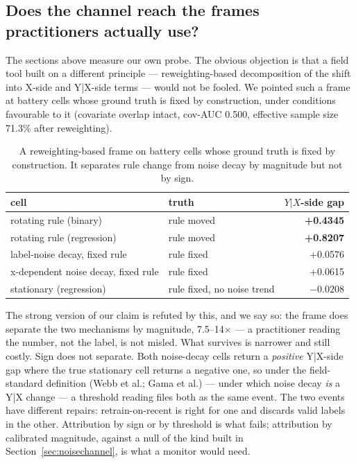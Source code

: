 \documentclass[10pt]{article} %
\begin{document}
\subsection{Does the channel reach the frames practitioners actually use?}\label{sec:frames}

The sections above measure our own probe. The obvious objection is that a field tool built on a
different principle --- reweighting-based decomposition of the shift into X-side and Y|X-side terms
--- would not be fooled. We pointed such a frame at battery cells whose ground truth is fixed by
construction, under conditions favourable to it (covariate overlap intact, cov-AUC 0.500, effective
sample size 71.3\% after reweighting).

\begin{table}[t]
\centering
\small
\caption{A reweighting-based frame on battery cells whose ground truth is fixed by construction. It separates rule change from noise decay by magnitude but not by sign.}
\label{tab:1}
\begin{tabular}{@{}llr@{}}
\toprule
cell & truth & $Y|X$-side gap \\
\midrule
rotating rule (binary) & rule moved & \textbf{+0.4345} \\
rotating rule (regression) & rule moved & \textbf{+0.8207} \\
label-noise decay, fixed rule & rule fixed & +0.0576 \\
x-dependent noise decay, fixed rule & rule fixed & +0.0615 \\
stationary (regression) & rule fixed, no noise trend & $-0.0208$ \\
\bottomrule
\end{tabular}
\end{table}

The strong version of our claim is refuted by this, and we say so: the frame does separate the
two mechanisms by magnitude, 7.5--14$\times$ --- a practitioner reading the number, not the label, is not
misled. What survives is narrower and still costly. Sign does not separate. Both noise-decay
cells return a \emph{positive} Y|X-side gap where the true stationary cell returns a negative one, so
under the field-standard definition (Webb et al.; Gama et al.) --- under which noise decay \emph{is} a
Y|X change --- a threshold reading files both as the same event. The two events have different
repairs: retrain-on-recent is right for one and discards valid labels in the other. Attribution by
sign or by threshold is what fails; attribution by calibrated magnitude, against a null of the kind
built in Section~\ref{sec:noisechannel}, is what a monitor would need.
\end{document}
